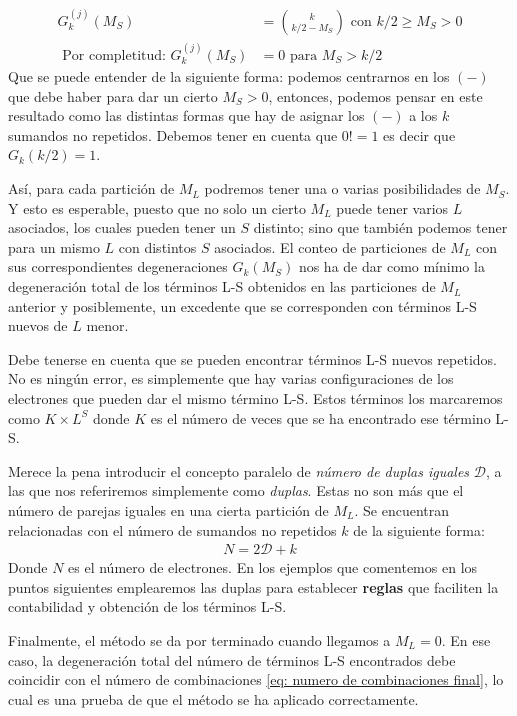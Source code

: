 \begin{align}
  G^{(j)}_{k}(M_{S}) &= \binom{k}{k/2 - M_{S}} \text{ con } k/2 \geq M_{S} > 0 \label{degeneracion M_S}\\ 
  \text{ Por completitud: } G^{(j)}_{k}(M_{S}) &= 0 \text{ para } M_{S} > k/2
\end{align}
Que se puede entender de la siguiente forma: podemos centrarnos en los $(-)$ que debe haber para dar un cierto $M_{S}>0$, entonces, podemos pensar en este resultado como las distintas formas que hay de asignar los $(-)$ a los $k$ sumandos no repetidos. Debemos tener en cuenta que $0! = 1$ es decir que $G_{k}(k/2) = 1$.\par 
Así, para cada partición de $M_{L}$ podremos tener una o varias posibilidades de $M_{S}$. Y esto es esperable, puesto que no solo un cierto $M_{L}$ puede tener varios $L$ asociados, los cuales pueden tener un $S$ distinto; sino que también podemos tener para un mismo $L$ con distintos $S$ asociados. El conteo de particiones de $M_{L}$ con sus correspondientes degeneraciones $G_{k}(M_{S})$ nos ha de dar como mínimo la degeneración total de los términos L-S obtenidos en las particiones de $M_{L}$ anterior y posiblemente, un excedente que se corresponden con términos L-S nuevos de $L$ menor.\par 
Debe tenerse en cuenta que se pueden encontrar términos L-S nuevos repetidos. No es ningún error, es simplemente que hay varias configuraciones de los electrones que pueden dar el mismo término L-S. Estos términos los marcaremos como $K \times L^{S}$ donde $K$ es el número de veces que se ha encontrado ese término L-S. \par 
Merece la pena introducir el concepto paralelo de \textit{número de duplas iguales} $\mathcal{D}$, a las que nos referiremos simplemente como \textit{duplas}. Estas no son más que el número de parejas iguales en una cierta partición de $M_{L}$. Se encuentran relacionadas con el número de sumandos no repetidos $k$ de la siguiente forma: 
\begin{align*}
N = 2 \mathcal{D} + k 
\end{align*}
Donde $N$ es el número de electrones. En los ejemplos que comentemos en los puntos siguientes emplearemos las duplas para establecer \textbf{reglas} que faciliten la contabilidad y obtención de los términos L-S.\par
Finalmente, el método se da por terminado cuando llegamos a $M_{L} = 0$. En ese caso, la degeneración total del número de términos L-S encontrados debe coincidir con el número de combinaciones \eqref{eq: numero de combinaciones final}, lo cual es una prueba de que el método se ha aplicado correctamente. \par


